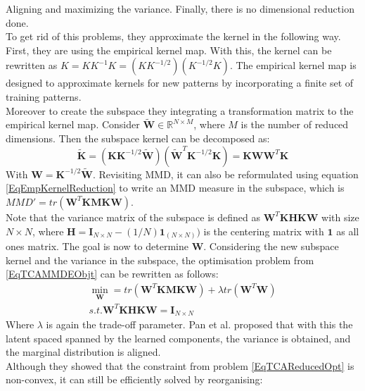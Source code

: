 Aligning and maximizing the variance.
Finally, there is no dimensional reduction done.\cite{Pan.2011}\\
To get rid of this problems, they approximate the kernel in the following way.
First, they are using the empirical kernel map.
With this, the kernel can be rewritten as $K = KK^{-1}K = (KK^{-1/2})(K^{-1/2}K)$.\cite{Pan.2011}
The empirical kernel map is designed to approximate kernels for new patterns by incorporating a finite set of training patterns.\cite{Scholkopf.2001}\\
Moreover to create the subspace they integrating a transformation matrix to the empirical kernel map.
Consider $\tilde{\mathbf{W}} \in \mathbb{R}^{N\times M}$, where $M$ is the number of reduced dimensions.
Then the subspace kernel can be decomposed as:\cite{Pan.2011}
\begin{equation}\label{EqEmpKernelReduction}
	\tilde{\mathbf{K}} = (\mathbf{KK}^{-1/2}\tilde{\mathbf{W}})(\tilde{\mathbf{W}}^T\mathbf{K}^{-1/2} \mathbf{K}) = \mathbf{KWW}^T\mathbf{K}
\end{equation}
With $\mathbf{W} = \mathbf{K}^{-1/2}\tilde{\mathbf{W}}$.
Revisiting \acs{MMD}, it can also be reformulated using equation \eqref{EqEmpKernelReduction} to write an \acs{MMD} measure in the subspace, which is $MMD'= tr(\mathbf{W}^T\mathbf{KMKW})$.\\
Note that the variance matrix of the subspace is defined as $\mathbf{W}^T\mathbf{KHKW}$ with size $N \times N$, where $\mathbf{H} = \mathbf{I}_{N\times N} - (1/N)\mathbf{1}_{(N\times N)})$ is the centering matrix with $\mathbf{1}$ as all ones matrix.
The goal is now to determine $\mathbf{W}$.
Considering the new subspace kernel and the variance in the subspace, the optimisation problem from \eqref{EqTCAMMDEObjt} can be rewritten as follows:\cite{Pan.2011}
\begin{equation}\label{EqTCAReducedOpt}
	\begin{gathered}
		\min_{\mathbf{W}} = tr(\mathbf{W}^T\mathbf{KMKW}) + \lambda tr(\mathbf{W}^T\mathbf{W})\\
		s.t. \mathbf{W}^T\mathbf{KHKW} = \mathbf{I}_{N \times N}
	\end{gathered}
\end{equation}
Where $\lambda$ is again the trade-off parameter.
Pan et al. proposed that with this the latent spaced spanned by the learned components, the variance is obtained, and the marginal distribution is aligned.\\
Although they showed that the constraint from problem \eqref{EqTCAReducedOpt} is non-convex, it can still be efficiently solved by reorganising:\cite{Pan.2011}
